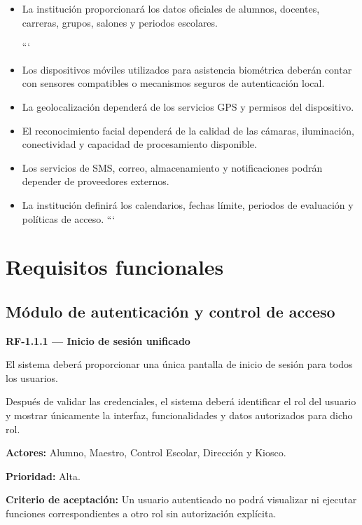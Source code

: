 \documentclass[12pt,a4paper]{article}
\newcommand{\RF}[1]{\textbf{\color{primary}RF-#1}}
\newenvironment{requisito}[1]
{
\begin{center}
\begin{minipage}{0.96\textwidth}
\colorbox{requirement}{
\begin{minipage}{0.94\textwidth}
\textbf{#1}
\end{minipage}
}
\vspace{2mm}
}
{
\end{minipage}
\end{center}
}
\begin{document}
\begin{itemize}[leftmargin=*]
\item La institución proporcionará los datos oficiales de alumnos, docentes,
carreras, grupos, salones y periodos escolares.

```
\item Los dispositivos móviles utilizados para asistencia biométrica deberán
contar con sensores compatibles o mecanismos seguros de autenticación local.

\item La geolocalización dependerá de los servicios GPS y permisos del dispositivo.

\item El reconocimiento facial dependerá de la calidad de las cámaras, iluminación,
conectividad y capacidad de procesamiento disponible.

\item Los servicios de SMS, correo, almacenamiento y notificaciones podrán depender
de proveedores externos.

\item La institución definirá los calendarios, fechas límite, periodos de evaluación
y políticas de acceso.
```

\end{itemize}

\section{Requisitos funcionales}

\subsection{Módulo de autenticación y control de acceso}

\begin{requisito}{\RF{1.1.1} --- Inicio de sesión unificado}
El sistema deberá proporcionar una única pantalla de inicio de sesión para todos
los usuarios.

Después de validar las credenciales, el sistema deberá identificar el rol del
usuario y mostrar únicamente la interfaz, funcionalidades y datos autorizados
para dicho rol.

\textbf{Actores:} Alumno, Maestro, Control Escolar, Dirección y Kiosco.

\textbf{Prioridad:} Alta.

\textbf{Criterio de aceptación:} Un usuario autenticado no podrá visualizar ni
ejecutar funciones correspondientes a otro rol sin autorización explícita.
\end{requisito}
\end{document}
